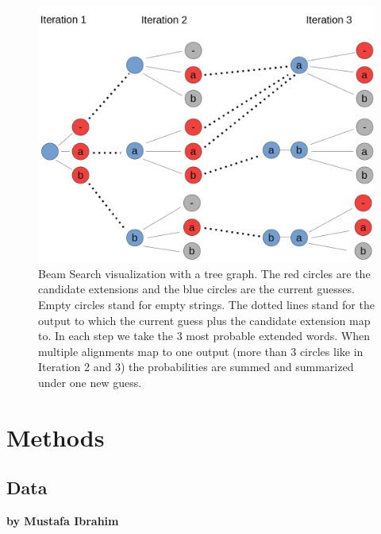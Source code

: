 \documentclass{article}
\begin{document}
\begin{figure}[H]
\begin{center}
\includegraphics[scale=0.2]{rsz_beam}
\end{center}
\caption{Beam Search visualization with a tree graph. The red circles are the candidate extensions and the blue circles are the current guesses. Empty circles stand for empty strings. The dotted lines stand for the output to which the current guess plus the candidate extension map to. In each step we take the 3 most probable extended words. When multiple alignments map to one output (more than 3 circles like in Iteration 2 and 3) the probabilities are summed and summarized under one new guess. }
\label{fig:beamsearch}
\end{figure}  

\newpage
\section{Methods}

\subsection{Data}

\textbf{by Mustafa Ibrahim} \\
\end{document}
